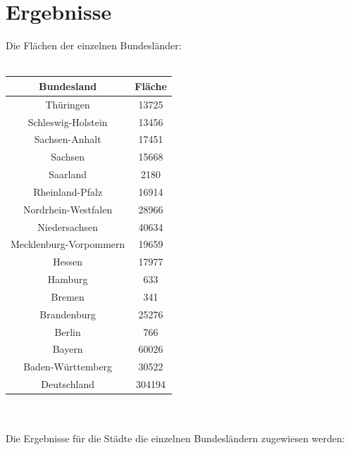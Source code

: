 \documentclass[conference]{IEEEtran}
\begin{document}
	\section{Ergebnisse}
	Die Flächen der einzelnen Bundesländer:\\
	\\
	\begin{tabular}{|c|c|}		
		\hline
		\textbf{Bundesland} & \textbf{Fläche}\\
		\hline
		Thüringen & 13725\\
		\hline
		Schleswig-Holstein & 13456\\
		\hline
		Sachsen-Anhalt & 17451\\
		\hline
		Sachsen & 15668\\
		\hline
		Saarland & 2180\\
		\hline
		Rheinland-Pfalz & 16914\\
		\hline
		Nordrhein-Westfalen & 28966\\
		\hline
		Niedersachsen & 40634\\
		\hline
		Mecklenburg-Vorpommern & 19659\\
		\hline
		Hessen & 17977\\
		\hline
		Hamburg & 633\\
		\hline
		Bremen & 341\\
		\hline
		Brandenburg & 25276\\
		\hline
		Berlin & 766\\
		\hline
		Bayern & 60026\\
		\hline
		Baden-Württemberg & 30522\\
		\hline
		Deutschland & 304194\\
		\hline
	\end{tabular}\\
	\vspace{2.0cm}\\
	Die Ergebnisse für die Städte die einzelnen Bundesländern zugewiesen werden:
	\vspace{0.5cm}\\
\end{document}
